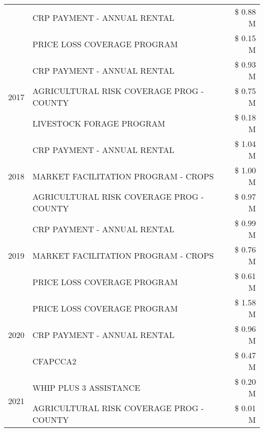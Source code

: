 \begin{tabular}{llr}
 & CRP PAYMENT - ANNUAL RENTAL & \$ 0.88 M \\
 & PRICE LOSS COVERAGE PROGRAM & \$ 0.15 M \\
\cline{1-3}
\multirow[t]{3}{*}{2017} & CRP PAYMENT - ANNUAL RENTAL & \$ 0.93 M \\
 & AGRICULTURAL RISK COVERAGE PROG - COUNTY & \$ 0.75 M \\
 & LIVESTOCK FORAGE PROGRAM & \$ 0.18 M \\
\cline{1-3}
\multirow[t]{3}{*}{2018} & CRP PAYMENT - ANNUAL RENTAL & \$ 1.04 M \\
 & MARKET FACILITATION PROGRAM - CROPS & \$ 1.00 M \\
 & AGRICULTURAL RISK COVERAGE PROG - COUNTY & \$ 0.97 M \\
\cline{1-3}
\multirow[t]{3}{*}{2019} & CRP PAYMENT - ANNUAL RENTAL & \$ 0.99 M \\
 & MARKET FACILITATION PROGRAM - CROPS & \$ 0.76 M \\
 & PRICE LOSS COVERAGE PROGRAM & \$ 0.61 M \\
\cline{1-3}
\multirow[t]{3}{*}{2020} & PRICE LOSS COVERAGE PROGRAM & \$ 1.58 M \\
 & CRP PAYMENT - ANNUAL RENTAL & \$ 0.96 M \\
 & CFAPCCA2 & \$ 0.47 M \\
\cline{1-3}
\multirow[t]{2}{*}{2021} & WHIP PLUS 3 ASSISTANCE & \$ 0.20 M \\
 & AGRICULTURAL RISK COVERAGE PROG - COUNTY & \$ 0.01 M \\
\cline{1-3}
\bottomrule
\end{tabular}
